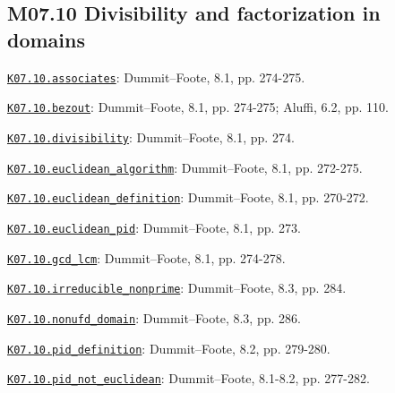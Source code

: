 \subsection*{M07.10 Divisibility and factorization in domains}
\par\smallskip\noindent\hypertarget{src:K07.10.associates}{}\label{src:K07.10.associates}\hyperref[K07.10.associates]{\texttt{K07.10.associates}}: Dummit--Foote, 8.1, pp. 274-275.
\par\smallskip\noindent\hypertarget{src:K07.10.bezout}{}\label{src:K07.10.bezout}\hyperref[K07.10.bezout]{\texttt{K07.10.bezout}}: Dummit--Foote, 8.1, pp. 274-275; Aluffi, 6.2, pp. 110.
\par\smallskip\noindent\hypertarget{src:K07.10.divisibility}{}\label{src:K07.10.divisibility}\hyperref[K07.10.divisibility]{\texttt{K07.10.divisibility}}: Dummit--Foote, 8.1, pp. 274.
\par\smallskip\noindent\hypertarget{src:K07.10.euclidean_algorithm}{}\label{src:K07.10.euclidean_algorithm}\hyperref[K07.10.euclidean_algorithm]{\texttt{K07.10.euclidean\_algorithm}}: Dummit--Foote, 8.1, pp. 272-275.
\par\smallskip\noindent\hypertarget{src:K07.10.euclidean_definition}{}\label{src:K07.10.euclidean_definition}\hyperref[K07.10.euclidean_definition]{\texttt{K07.10.euclidean\_definition}}: Dummit--Foote, 8.1, pp. 270-272.
\par\smallskip\noindent\hypertarget{src:K07.10.euclidean_pid}{}\label{src:K07.10.euclidean_pid}\hyperref[K07.10.euclidean_pid]{\texttt{K07.10.euclidean\_pid}}: Dummit--Foote, 8.1, pp. 273.
\par\smallskip\noindent\hypertarget{src:K07.10.gcd_lcm}{}\label{src:K07.10.gcd_lcm}\hyperref[K07.10.gcd_lcm]{\texttt{K07.10.gcd\_lcm}}: Dummit--Foote, 8.1, pp. 274-278.
\par\smallskip\noindent\hypertarget{src:K07.10.irreducible_nonprime}{}\label{src:K07.10.irreducible_nonprime}\hyperref[K07.10.irreducible_nonprime]{\texttt{K07.10.irreducible\_nonprime}}: Dummit--Foote, 8.3, pp. 284.
\par\smallskip\noindent\hypertarget{src:K07.10.nonufd_domain}{}\label{src:K07.10.nonufd_domain}\hyperref[K07.10.nonufd_domain]{\texttt{K07.10.nonufd\_domain}}: Dummit--Foote, 8.3, pp. 286.
\par\smallskip\noindent\hypertarget{src:K07.10.pid_definition}{}\label{src:K07.10.pid_definition}\hyperref[K07.10.pid_definition]{\texttt{K07.10.pid\_definition}}: Dummit--Foote, 8.2, pp. 279-280.
\par\smallskip\noindent\hypertarget{src:K07.10.pid_not_euclidean}{}\label{src:K07.10.pid_not_euclidean}\hyperref[K07.10.pid_not_euclidean]{\texttt{K07.10.pid\_not\_euclidean}}: Dummit--Foote, 8.1-8.2, pp. 277-282.
